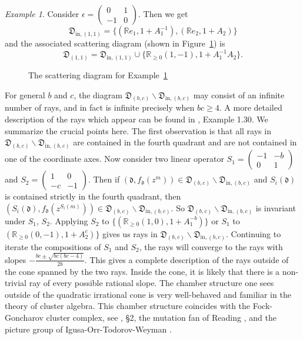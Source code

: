 \documentclass[12pt]{amsart}
\theoremstyle{remark}
\newtheorem{example}[theorem]{Example}
\newcommand{\RR}{\mathbb{R}}
\newcommand{\dd}{\mathfrak{d}}
\newcommand{\DD}{\mathfrak{D}}
\begin{document}
\begin{example} \label{ex}
Consider $\epsilon =  \begin{pmatrix}
0 &1 \\
-1 &0
\end{pmatrix}$. 
Then we get
\[\DD_{\mathrm{in},(1,1)} =  \{ (\RR e_1, 1+A_1^{-1}), (\RR e_2, 1+A_2)  \}   \]
and the associated scattering diagram (shown in Figure~\ref{fig:diagex}) is
\[ \DD_{(1,1)} = \DD_{\mathrm{in},(1,1)} \cup \{\RR_{\geq 0} (1,-1), 1+A_1^{-1}A_2  \}.   \]

\begin{figure}
\centering
{}
\caption{The scattering diagram for Example~\ref{ex}} \label{fig:diagex}
\end{figure}
\end{example}

For general $b$ and $c$, the diagram $\DD_{(b,c)} \backslash 
\DD_{\mathrm{in},(b,c)}$ may 
consist of an infinite number of rays, and in fact is infinite precisely
when $bc\ge 4$. A more detailed description of the rays which appear
can be found in \cite{GHKK}, Example 1.30. We summarize the crucial
points here.
The first observation is that all rays in $\DD_{(b,c)} \backslash 
\DD_{\mathrm{in},(b,c)}$
are contained in the fourth quadrant and are not contained in one of the
coordinate axes. Now consider two linear operator
$S_1 =  
\begin{pmatrix}
-1 & -b \\
0& 1
\end{pmatrix}
$
and
$S_2 =  
\begin{pmatrix}
1 & 0 \\
-c & -1
\end{pmatrix}
$.
Then if $(\dd, f_{\dd}(z^m)) \in \DD_{(b,c)} \backslash \DD_{\mathrm{in},(b,c)}$
and $S_i (\dd)$ is contained strictly in the fourth quadrant, then 
$(S_i(\dd), f_{\dd}(z^{S_i(m)})) \in \DD_{(b,c)} \backslash 
\DD_{\mathrm{in},(b,c)}$. 
So $\DD_{(b,c)} \backslash \DD_{\mathrm{in},(b,c)}$ is invariant under $S_1$, $S_2$. 
Applying $S_2$ to $\{ (\RR_{\geq 0}(1,0), 1+A_1^{-b}) \}$ or $S_1$ to 
$(\RR_{\geq 0}(0,-1), 1+A_2^c)  \}$ gives us rays in $\DD_{(b,c)} \backslash 
\DD_{\mathrm{in},(b,c)}$. Continuing to iterate the compositions of $S_1$ and $S_2$, 
the rays will converge to the rays with slopes $-\frac{bc \pm \sqrt{bc(bc-4)}}{2b}$. This gives a complete description of the rays outside of the cone spanned by the two rays. Inside the cone, it is likely that there is a non-trivial
ray of every possible rational slope. 
 The chamber structure one sees outside of the quadratic 
irrational cone is very well-behaved and familiar in the theory of
cluster algebra. This chamber structure coincides with the Fock-Goncharov 
cluster complex, see \cite{GHKK}, \S2, the mutation fan of Reading \cite{R}, 
and the picture group of Igusa-Orr-Todorov-Weyman \cite{IOTW}.
\end{document}
